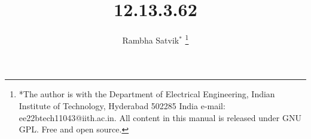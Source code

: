 \documentclass[journal,12pt,twocolumn]{IEEEtran}
\theoremstyle{remark}
\begin{document}
%




\vspace{3cm}

\title{12.13.3.62}
\author{ Rambha Satvik$^{*}$%
	\thanks{*The author is with the Department
		of Electrical Engineering, Indian Institute of Technology, Hyderabad
		502285 India e-mail: ee22btech11043@iith.ac.in. All content in this manual is released under GNU GPL.  Free and open source.}
	
}	


%
%
%

% 
%



% 
\end{document}
